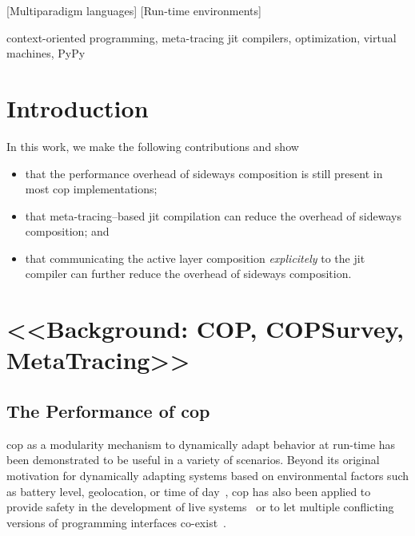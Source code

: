 \documentclass[preprint,english,10pt,nonatbib]{sigplanconf}
\begin{document}
[Mul\-ti\-par\-a\-digm languages]
[Run-time environments]

\keywords
context-oriented programming,
meta-tracing \acs{jit} compilers,
optimization,
virtual machines,
PyPy

\section{Introduction}




In this work, we make the following contributions and show
\begin{itemize}
\item that the performance overhead of sideways composition is still
  present in most \ac{cop} implementations;
\item that meta-tracing--based \ac{jit} compilation can reduce the
  overhead of sideways composition; and
\item that communicating the active layer composition \emph{explicitely} to the
  \ac{jit} compiler can further reduce the overhead of sideways composition.
\end{itemize}


\section{<<Background: COP, COPSurvey, MetaTracing>>}

\subsection{The Performance of \acs{cop}}
\label{sec:performance-cop}
\ac{cop} as a modularity mechanism to dynamically adapt behavior at run-time has
been demonstrated to be useful in a variety of scenarios. Beyond its original
motivation for dynamically adapting systems based on environmental factors such
as battery level, geolocation, or time of day~, \ac{cop} has also
been applied to provide safety in the development of live
systems~\cite{lincke+:2012:scoping-changes} or to let multiple conflicting
versions of programming interfaces co-exist~.
\end{document}
